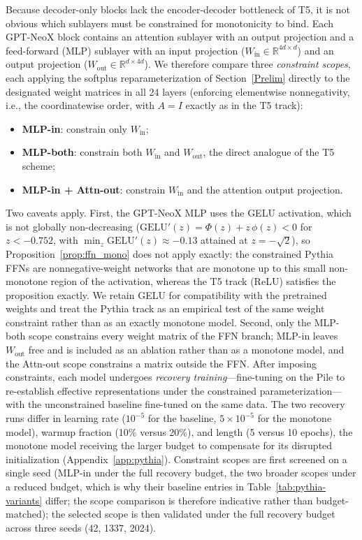 \documentclass{article}
\theoremstyle{plain}
\theoremstyle{definition}
\theoremstyle{remark}
\theoremstyle{plain}
\begin{document}
Because decoder-only blocks lack the encoder-decoder bottleneck of T5, it is not obvious which sublayers must be constrained for monotonicity to bind. Each GPT-NeoX block contains an attention sublayer with an output projection and a feed-forward (MLP) sublayer with an input projection ($W_{\mathrm{in}} \in \mathbb{R}^{4d \times d}$) and an output projection ($W_{\mathrm{out}} \in \mathbb{R}^{d \times 4d}$). We therefore compare three \emph{constraint scopes}, each applying the softplus reparameterization of Section~\ref{Prelim} directly to the designated weight matrices in all 24 layers (enforcing elementwise nonnegativity, i.e., the coordinatewise order, with $A = I$ exactly as in the T5 track):
\begin{itemize}
    \item \textbf{MLP-in}: constrain only $W_{\mathrm{in}}$;
    \item \textbf{MLP-both}: constrain both $W_{\mathrm{in}}$ and $W_{\mathrm{out}}$, the direct analogue of the T5 scheme;
    \item \textbf{MLP-in + Attn-out}: constrain $W_{\mathrm{in}}$ and the attention output projection.
\end{itemize}
Two caveats apply. First, the GPT-NeoX MLP uses the GELU activation, which is not globally non-decreasing ($\mathrm{GELU}'(z) = \Phi(z) + z\,\phi(z) < 0$ for $z < -0.752$, with $\min_z \mathrm{GELU}'(z) \approx -0.13$ attained at $z = -\sqrt{2}$), so Proposition~\ref{prop:ffn_mono} does not apply exactly: the constrained Pythia FFNs are nonnegative-weight networks that are monotone up to this small non-monotone region of the activation, whereas the T5 track (ReLU) satisfies the proposition exactly. We retain GELU for compatibility with the pretrained weights and treat the Pythia track as an empirical test of the same weight constraint rather than as an exactly monotone model. Second, only the MLP-both scope constrains every weight matrix of the FFN branch; MLP-in leaves $W_{\mathrm{out}}$ free and is included as an ablation rather than as a monotone model, and the Attn-out scope constrains a matrix outside the FFN.
After imposing constraints, each model undergoes \emph{recovery training}---fine-tuning on the Pile to re-establish effective representations under the constrained parameterization---with the unconstrained baseline fine-tuned on the same data.
The two recovery runs differ in learning rate ($10^{-5}$ for the baseline, $5\times 10^{-5}$ for the monotone model), warmup fraction (10\% versus 20\%), and length (5 versus 10 epochs), the monotone model receiving the larger budget to compensate for its disrupted initialization (Appendix~\ref{app:pythia}). Constraint scopes are first screened on a single seed (MLP-in under the full recovery budget, the two broader scopes under a reduced budget, which is why their baseline entries in Table~\ref{tab:pythia-variants} differ; the scope comparison is therefore indicative rather than budget-matched); the selected scope is then validated under the full recovery budget across three seeds (42, 1337, 2024).
\end{document}
